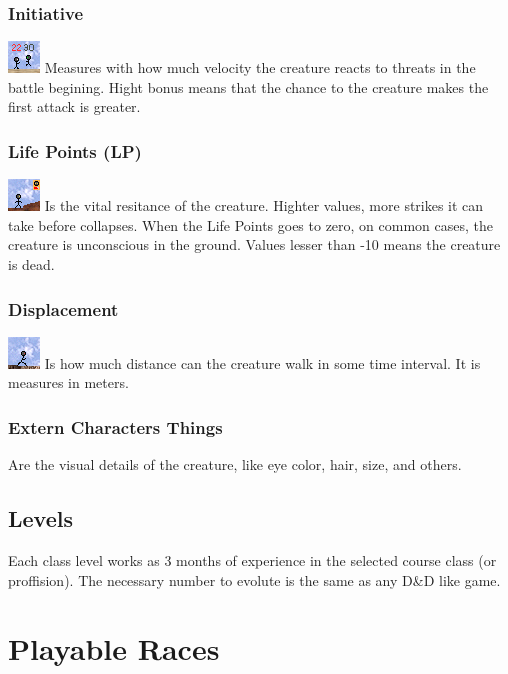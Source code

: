\documentclass[ letterpaper,12pt]{article}
\begin{document}
\subsubsection{Initiative}
\includegraphics{../data/skills/Img/iniciativa.png}
Measures with how much velocity the creature reacts to threats in the battle begining. Hight bonus means that the chance to the creature makes the first attack is greater.

\subsubsection{Life Points (LP)}
\includegraphics{../data/skills/Img/pv.png}
Is the vital resitance of the creature. Highter values, more strikes it can take before collapses. When the Life Points goes to zero, on common cases, the creature is unconscious in the ground. Values lesser than -10 means the creature is dead.

\subsubsection{Displacement}
\includegraphics{../data/skills/Img/deslocamento.png}
Is how much distance can the creature walk in some time interval. It is measures in meters.

\subsubsection{Extern Characters Things}
Are the visual details of the creature, like eye color, hair, size, and others.

\subsection{Levels}
Each class level works as 3 months of experience in the selected course class (or proffision). The necessary number to evolute is the same as any D\&D like game.

\section{Playable Races}
\end{document}
